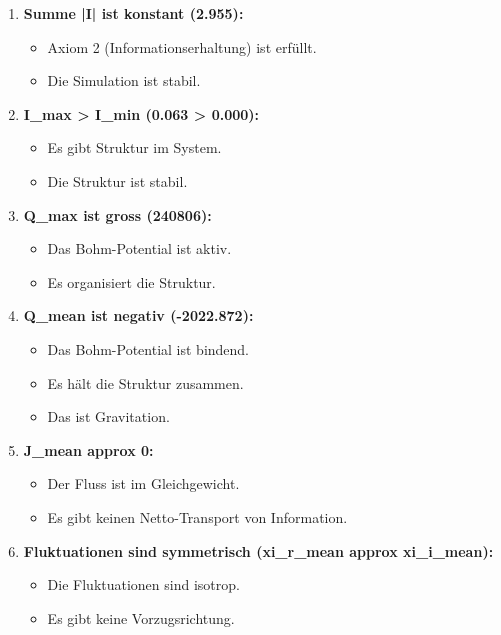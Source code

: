 \begin{enumerate}
\item \textbf{Summe |I|\texttwosuperior{} ist konstant (2.955):}
      \begin{itemize}
      \item Axiom 2 (Informationserhaltung) ist erfüllt.
      \item Die Simulation ist stabil.
      \end{itemize}

\item \textbf{I\_max > I\_min (0.063 > 0.000):}
      \begin{itemize}
      \item Es gibt Struktur im System.
      \item Die Struktur ist stabil.
      \end{itemize}

\item \textbf{Q\_max ist gross (240806):}
      \begin{itemize}
      \item Das Bohm-Potential ist aktiv.
      \item Es organisiert die Struktur.
      \end{itemize}

\item \textbf{Q\_mean ist negativ (-2022.872):}
      \begin{itemize}
      \item Das Bohm-Potential ist bindend.
      \item Es hält die Struktur zusammen.
      \item Das ist Gravitation.
      \end{itemize}

\item \textbf{J\_mean approx 0:}
      \begin{itemize}
      \item Der Fluss ist im Gleichgewicht.
      \item Es gibt keinen Netto-Transport von Information.
      \end{itemize}

\item \textbf{Fluktuationen sind symmetrisch (xi\_r\_mean approx xi\_i\_mean):}
      \begin{itemize}
      \item Die Fluktuationen sind isotrop.
      \item Es gibt keine Vorzugsrichtung.
      \end{itemize}
\end{enumerate}


